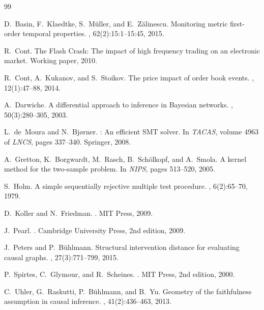 \documentclass[11pt]{article}
\begin{document}

\begin{thebibliography}{99}

D.~Basin, F.~Klaedtke, S.~M\"uller, and E.~Z\u{a}linescu.
\newblock Monitoring metric first-order temporal properties.
, 62(2):15:1--15:45, 2015.

R.~Cont.
\newblock The {Flash Crash}: The impact of high frequency trading on an electronic market.
\newblock Working paper, 2010.

R.~Cont, A.~Kukanov, and S.~Stoikov.
\newblock The price impact of order book events.
, 12(1):47--88, 2014.

A.~Darwiche.
\newblock A differential approach to inference in {B}ayesian networks.
, 50(3):280--305, 2003.

L.~de~Moura and N.~Bj{\o}rner.
: An efficient {SMT} solver.
\newblock In {\em TACAS}, volume 4963 of {\em LNCS}, pages 337--340. Springer, 2008.

A.~Gretton, K.~Borgwardt, M.~Rasch, B.~Sch\"olkopf, and A.~Smola.
\newblock A kernel method for the two-sample problem.
\newblock In {\em NIPS}, pages 513--520, 2005.

S.~Holm.
\newblock A simple sequentially rejective multiple test procedure.
, 6(2):65--70, 1979.

D.~Koller and N.~Friedman.
.
\newblock MIT Press, 2009.

J.~Pearl.
.
\newblock Cambridge University Press, 2nd edition, 2009.

J.~Peters and P.~B\"uhlmann.
\newblock Structural intervention distance for evaluating causal graphs.
, 27(3):771--799, 2015.

P.~Spirtes, C.~Glymour, and R.~Scheines.
.
\newblock MIT Press, 2nd edition, 2000.

C.~Uhler, G.~Raskutti, P.~B\"uhlmann, and B.~Yu.
\newblock Geometry of the faithfulness assumption in causal inference.
, 41(2):436--463, 2013.

\end{thebibliography}
\end{document}
